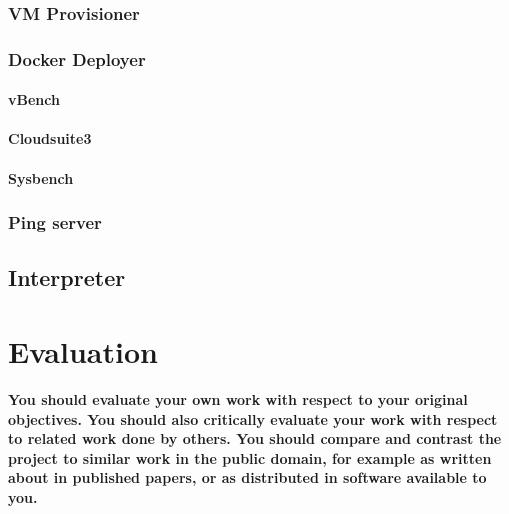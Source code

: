 \documentclass{article}
\begin{document}
\subsubsection{VM Provisioner}
\subsubsection{Docker Deployer}
\paragraph{vBench}
\paragraph{Cloudsuite3}
\paragraph{Sysbench}
\subsubsection{Ping server}


\subsection{Interpreter}

\section{Evaluation}
\textbf{You should evaluate your own work with respect to your original objectives. You should also critically evaluate your work with respect to related work done by others. You should compare and contrast the project to similar work in the public domain, for example as written about in published papers, or as distributed in software available to you.}


\end{document}
